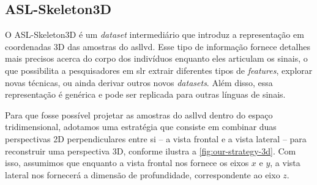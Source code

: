 \subsection{ASL-Skeleton3D}
\label{sec:metodologia-datasets-3d}


O ASL-Skeleton3D é um \textit{dataset} intermediário que introduz a representação em coordenadas 3D das amostras do \acrshort{asllvd}. 
Esse tipo de informação fornece detalhes mais precisos acerca do corpo dos indivíduos enquanto eles articulam os sinais, o que possibilita a pesquisadores em \acrshort{slr} extrair diferentes tipos de \textit{features}, explorar novas técnicas, ou ainda derivar outros novos \textit{datasets}.
Além disso, essa representação é genérica e pode ser replicada para outras línguas de sinais.

Para que fosse possível projetar as amostras do \acrshort{asllvd} dentro do espaço tridimensional, adotamos uma estratégia que consiste em combinar duas perspectivas 2D perpendiculares entre si -- a vista frontal e a vista lateral -- para reconstruir uma perspectiva 3D, conforme ilustra a \autoref{fig:our-strategy-3d}. Com isso, assumimos que enquanto a vista frontal nos fornece os eixos \(x\) e \(y\), a vista lateral nos fornecerá a dimensão de profundidade, correspondente ao eixo \( z\).


